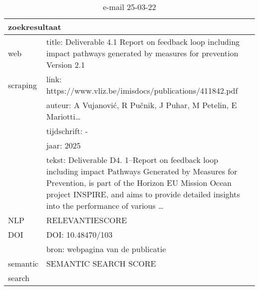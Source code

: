 \begin{table}[h!]
    \caption{e-mail 25-03-22}
    \centering
    \begin{tabularx}{\textwidth}{|p{4cm}|X|} 
        \hline
        \multicolumn{2}{|X|}{\textbf{zoekresultaat}} \\
        \hline
        web &title: Deliverable 4.1 Report on feedback loop including impact pathways generated by measures for prevention Version 2.1\\
        scraping&link: https://www.vliz.be/imisdocs/publications/411842.pdf\\
        &auteur: A Vujanović, R Pučnik, J Puhar, M Petelin, E Mariotti…\\
        &tijdschrift: -\\
        &jaar: 2025\\
        &tekst: Deliverable D4. 1–Report on feedback loop including impact Pathways Generated by Measures for Prevention, is part of the Horizon EU Mission Ocean project INSPIRE, and aims to provide detailed insights into the performance of various …\\
        \hline
        NLP&RELEVANTIESCORE\\
        \hline
        DOI&DOI: 10.48470/103\\
        &bron: webpagina van de publicatie\\
        \hline
        semantic&SEMANTIC SEARCH SCORE\\
        search&\\
        \hline
    \end{tabularx}
    \label{table:email20250322}
\end{table}
